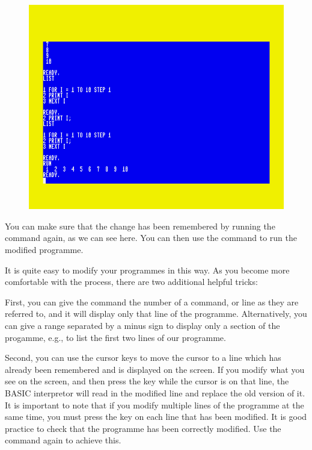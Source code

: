   \setlength{\intextsep}{0pt}%
  \begin{figure}
    \includegraphics[width=\linewidth]{images/first-steps-for-loop-programme-1-modified.png}
  \end{figure}

You can make sure that the change has been remembered by running the  command again, as we can see here.
You can then use the  command to run the modified programme.

It is quite easy to modify your programmes in this way.  As you become more comfortable with the process, there are two
additional helpful tricks:

First, you can give the  command the number of a command, or line as they are referred to, and it will display only
that line of the programme.  Alternatively, you can give a range separated by a minus sign to display only a section of the progamme,
e.g.,  to list the first two lines of our programme.

Second, you can use the cursor keys to move the cursor to a line which has already been remembered and is displayed on the screen. If you
modify what you see on the screen, and then press the  key while the cursor is on that line, the BASIC interpretor will
read in the modified line and replace the old version of it.  It is important to note that if you modify multiple lines of the programme
at the same time, you must press the  key on each line that has been modified. It is good practice to check that the
programme has been correctly modified. Use the  command again to achieve this.
  
